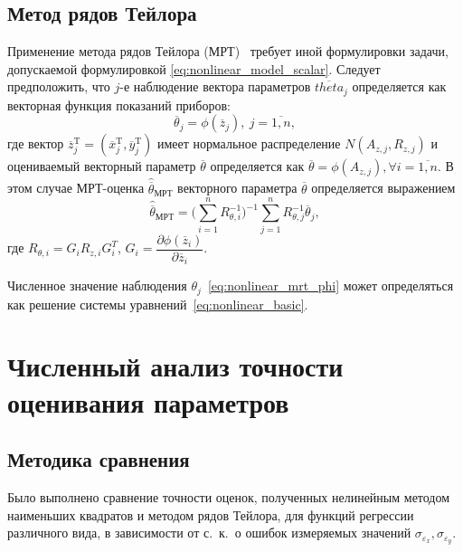\vspace{2\baselineskip}
\subsection{Метод рядов Тейлора}

Применение метода рядов Тейлора (МРТ)~\cite{mukha_2000}
требует иной формулировки задачи, допускаемой формулировкой \eqref{eq:nonlinear_model_scalar}.
Следует предположить, что \( j \)-е наблюдение вектора параметров \( \overline{theta}_j \)
определяется как векторная функция показаний приборов:
\begin{equation}
  \label{eq:nonlinear_mrt_phi}
  \overline{\theta}_j = \phi( \overline{z}_{j} ), \: j = \overline{1, n},
\end{equation}
где вектор
\( \overline{z}^{\text{T}}_{j} =
( \overline{x}^{\text{T}}_{j}, \overline{y}^{\text{T}}_{j}) \)
имеет нормальное распределение \( N(A_{z,j}, R_{z,j}) \)
и оцениваемый векторный параметр \( \overline{\theta} \) определяется как
\( \overline{\theta} = \phi(A_{z,j}), \forall i = \overline{1, n} \).
В этом случае МРТ-оценка \( \hat{\overline{\theta}}_{\text{МРТ}} \) векторного параметра \( \overline{\theta} \)
определяется выражением
\begin{equation}
  \label{eq:nonlinear_mrt}
  \hat{\overline{\theta}}_{\text{МРТ}} =
  \Bigg( \sum^{n}_{i=1} R^{-1}_{\theta,i} \Bigg)^{-1}
  \sum^{n}_{j=1} R^{-1}_{\theta,j} \overline{\theta}_j,
\end{equation}
где
\( R_{\theta,i} = G_i R_{z,i} G^T_i \),
\( G_i =
\dfrac{\partial \phi( \overline{z}_{i} ) }{ \partial \overline{z}_{i} } \).

Численное значение наблюдения \( \theta_j \)~\eqref{eq:nonlinear_mrt_phi} может определяться как
решение системы уравнений~\eqref{eq:nonlinear_basic}.


\section{Численный анализ точности оценивания параметров}

\subsection{Методика сравнения}

Было выполнено сравнение точности оценок,
полученных нелинейным методом наименьших квадратов и методом рядов Тейлора,
для функций регрессии различного вида,
в зависимости от с.~к.~о ошибок измеряемых значений
\( \sigma_{\varepsilon_x}, \sigma_{\varepsilon_y} \).

